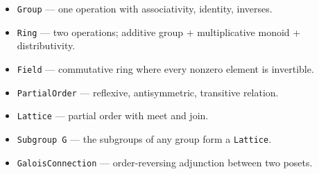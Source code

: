 \documentclass[11pt, a4paper, oneside]{book}
\newcommand{\lc}[1]{\texttt{#1}}
\begin{document}
\begin{itemize}[nosep]
\item \lc{Group} --- one operation with associativity, identity, inverses.
\item \lc{Ring} --- two operations; additive group + multiplicative monoid + distributivity.
\item \lc{Field} --- commutative ring where every nonzero element is invertible.
\item \lc{PartialOrder} --- reflexive, antisymmetric, transitive relation.
\item \lc{Lattice} --- partial order with meet and join.
\item \lc{Subgroup G} --- the subgroups of any group form a \lc{Lattice}.
\item \lc{GaloisConnection} --- order-reversing adjunction between two posets.
\end{itemize}
\end{document}
